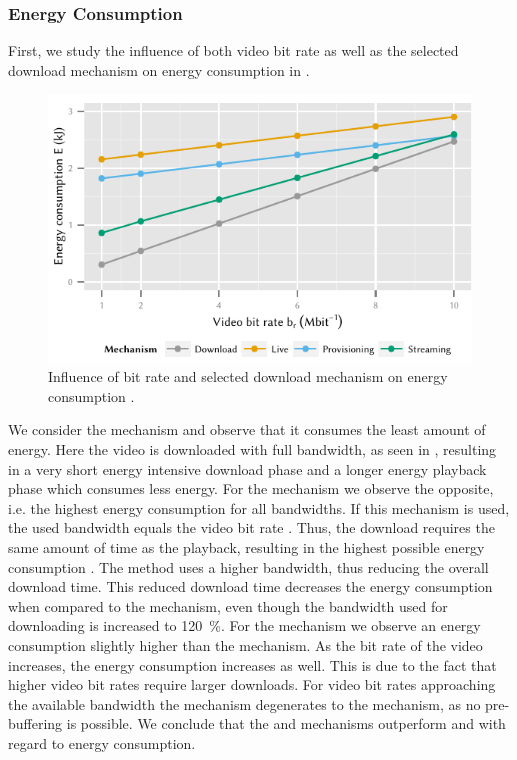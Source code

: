 \subsubsection*{Energy Consumption}\label{sec:application:lte_video:numerical_evaluation:energy_consumption}
First, we study the influence of both video bit rate \bitrate as well as the selected download mechanism on energy consumption in .
\begin{figure}
  \centering
  \includegraphics{application/lte_video/numerical_evaluation/figures/bitrate2energy}
  \caption{Influence of bit rate \bitrate and selected download mechanism on energy consumption \energyconsumption.}
  \label{fig:application:lte_video:numerical_evaluation:energy_consumption:bitrate2energy}
\end{figure}

We consider the \download mechanism and observe that it consumes the least amount of energy.
Here the video is downloaded with full bandwidth, as seen in , resulting in a very short energy intensive download phase and a longer energy playback phase which consumes less energy.
For the \live mechanism we observe the opposite, i.e. the highest energy consumption for all bandwidths.
If this mechanism is used, the used bandwidth equals the video bit rate \bitrate.
Thus, the download requires the same amount of time as the playback, resulting in the highest possible energy consumption \energyconsumption.
The \serviceprovisioning method uses a higher bandwidth, thus reducing the overall download time.
This reduced download time decreases the energy consumption \energyconsumption when compared to the \live mechanism, even though the bandwidth used for downloading is increased to \SI{120}{\percent}.
For the \streaming mechanism we observe an energy consumption \energyconsumption slightly higher than the \download mechanism.
As the bit rate \bitrate of the video increases, the energy consumption \energyconsumption increases as well.
This is due to the fact that higher video bit rates \bitrate require larger downloads.
For video bit rates \bitrate approaching the available bandwidth the \streaming mechanism degenerates to the \live mechanism, as no pre-buffering is possible.
We conclude that the \download and \streaming mechanisms outperform \live and \serviceprovisioning with regard to energy consumption.

